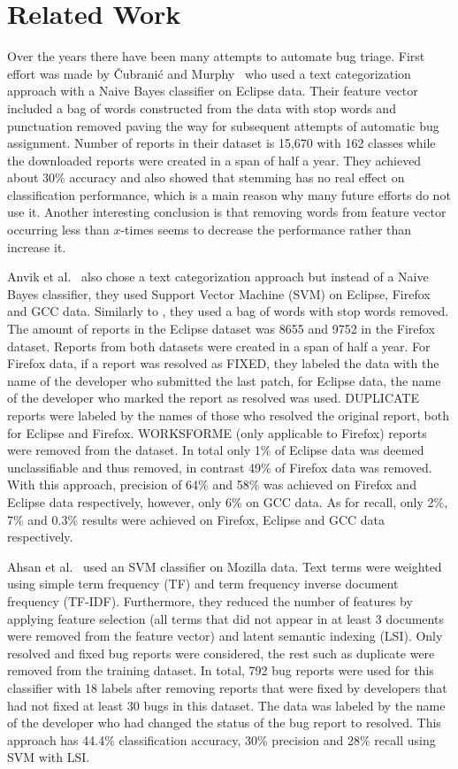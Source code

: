 \chapter{Related Work}
\label{chapter:related-work}

Over the years there have been many attempts to automate bug triage. First effort was made by Čubranić and Murphy~\cite{Murphy} who used a text categorization approach with a Naive Bayes classifier on Eclipse data. Their feature vector included a bag of words constructed from the data with stop words and punctuation removed paving the way for subsequent attempts of automatic bug assignment. Number of reports in their dataset is 15,670 with 162 classes while the downloaded reports were created in a span of half a year. They achieved about 30\% accuracy and also showed that stemming has no real effect on classification performance, which is a main reason why many future efforts do not use it. Another interesting conclusion is that removing words from feature vector occurring less than $x$-times seems to decrease the performance rather than increase it.

Anvik et al.~\cite{Anvik2006} also chose a text categorization approach but instead of a Naive Bayes classifier, they used Support Vector Machine (SVM) on Eclipse, Firefox and GCC data. Similarly to \cite{Murphy}, they used a bag of words with stop words removed. The amount of reports in the Eclipse dataset was 8655 and 9752 in the Firefox dataset. Reports from both datasets were created in a span of half a year. For Firefox data, if a report was resolved as FIXED, they labeled the data with the name of the developer who submitted the last patch, for Eclipse data, the name of the developer who marked the report as resolved was used. DUPLICATE reports were labeled by the names of those who resolved the original report, both for Eclipse and Firefox. WORKSFORME (only applicable to Firefox) reports were removed from the dataset. In total only 1\% of Eclipse data was deemed unclassifiable and thus removed, in contrast 49\% of Firefox data was removed. With this approach, precision of 64\% and 58\% was achieved on Firefox and Eclipse data respectively, however, only 6\% on GCC data. As for recall, only 2\%, 7\% and 0.3\% results were achieved on Firefox, Eclipse and GCC data respectively.

Ahsan et al.~\cite{Ahsan2009} used an SVM classifier on Mozilla data. Text terms were weighted using simple term frequency (TF) and term frequency inverse document frequency (TF-IDF). Furthermore, they reduced the number of features by applying feature selection (all terms that did not appear in at least 3 documents were removed from the feature vector) and latent semantic indexing (LSI). Only resolved and fixed bug reports were considered, the rest such as duplicate were removed from the training dataset. In total, 792 bug reports were used for this classifier with 18 labels after removing reports that were fixed by developers that had not fixed at least 30 bugs in this dataset. The data was labeled by the name of the developer who had changed the status of the bug report to resolved. This approach has 44.4\% classification accuracy, 30\% precision and 28\% recall using SVM with LSI.

